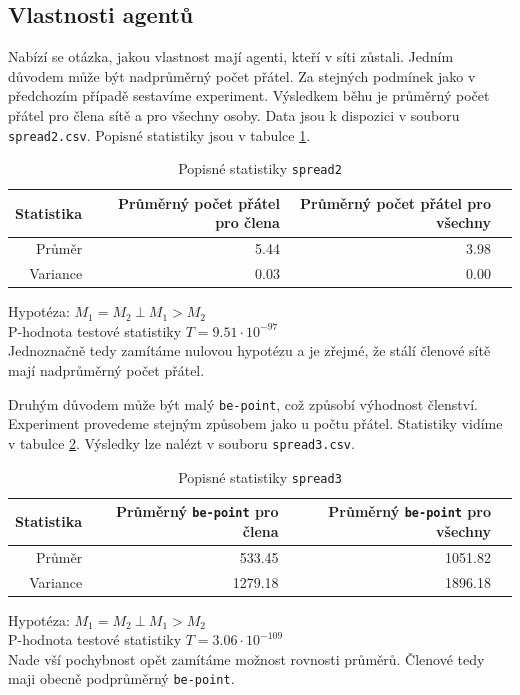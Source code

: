 \documentclass[a4wide,12pt]{report}
\begin{document}
\subsection{Vlastnosti agentů}
Nabízí se otázka, jakou vlastnost mají agenti, kteří v síti zůstali. Jedním důvodem může být nadprůměrný počet přátel. Za stejných podmínek jako v předchozím případě sestavíme experiment. Výsledkem běhu je průměrný počet přátel pro člena sítě a pro všechny osoby. Data jsou k dispozici v souboru \texttt{spread2.csv}. Popisné statistiky jsou v tabulce \ref{tab:spread2_desc}.
\begin{table}[H]
  \begin{center}
  \begin{tabular}{|r|r|r|r|}
  \hline
  Statistika&Průměrný počet přátel pro člena	&Průměrný počet přátel pro všechny\\\hline
  Průměr	&5.44	&3.98\\

  Variance	&0.03	&0.00\\\hline
  \end{tabular}
  \end{center}
  \caption{Popisné statistiky \texttt{spread2}}
  \label{tab:spread2_desc}
\end{table}
Hypotéza: $M_1=M_2 ~ \bot ~ M_1>M_2$\\
P-hodnota testové statistiky $T = 9.51\cdot 10^{-97}$\\
Jednoznačně tedy zamítáme nulovou hypotézu a je zřejmé, že stálí členové sítě mají nadprůměrný počet přátel.

Druhým důvodem může být malý \texttt{be-point}, což způsobí výhodnost členství. Experiment provedeme stejným způsobem jako u počtu přátel. Statistiky vidíme v tabulce \ref{tab:spread3_desc}. Výsledky lze nalézt v souboru \texttt{spread3.csv}.
\begin{table}[H]
  \begin{center}
  \begin{tabular}{|r|r|r|r|}
  \hline
  Statistika&Průměrný \texttt{be-point} pro člena	&Průměrný \texttt{be-point} pro všechny\\\hline
  Průměr	&533.45	&1051.82\\

  Variance	&1279.18	&1896.18\\\hline
  \end{tabular}
  \end{center}
  \caption{Popisné statistiky \texttt{spread3}}
  \label{tab:spread3_desc}
\end{table}
Hypotéza: $M_1=M_2 ~ \bot ~ M_1>M_2$\\
P-hodnota testové statistiky $T = 3.06\cdot 10^{-109}$\\
Nade vší pochybnost opět zamítáme možnost rovnosti průměrů. Členové tedy maji obecně podprůměrný \texttt{be-point}.
\end{document}
